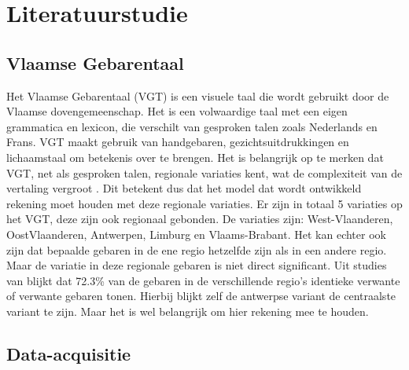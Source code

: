 \section{Literatuurstudie}%
\label{sec:literatuurstudie}

\subsection{Vlaamse Gebarentaal}
\label{subsec:vgt}

Het Vlaamse Gebarentaal (VGT) is een visuele taal die wordt gebruikt door de Vlaamse dovengemeenschap. 
Het is een volwaardige taal met een eigen grammatica en lexicon, die verschilt van gesproken talen zoals Nederlands en Frans. 
VGT maakt gebruik van handgebaren, gezichtsuitdrukkingen en lichaamstaal om betekenis over te brengen. 
Het is belangrijk op te merken dat VGT, net als gesproken talen, regionale variaties kent, wat de complexiteit van de vertaling vergroot \autocite{469340}.
Dit betekent dus dat het model dat wordt ontwikkeld rekening moet houden met deze regionale variaties.
Er zijn in totaal 5 variaties op het VGT, deze zijn ook regionaal gebonden.\autocite{469340}
De variaties zijn: West-Vlaanderen, OostVlaanderen, Antwerpen, Limburg en Vlaams-Brabant.
Het kan echter ook zijn dat bepaalde gebaren in de ene regio hetzelfde zijn als in een andere regio.
Maar de variatie in deze regionale gebaren is niet direct significant.
Uit studies van \textcite{469340} blijkt dat 72.3\% van de gebaren in de verschillende regio's identieke verwante of verwante gebaren tonen.
Hierbij blijkt zelf de antwerpse variant de centraalste variant te zijn.\autocite{469340}
Maar het is wel belangrijk om hier rekening mee te houden.


\subsection{Data-acquisitie}
\label{subsec:data-acquisitie}

